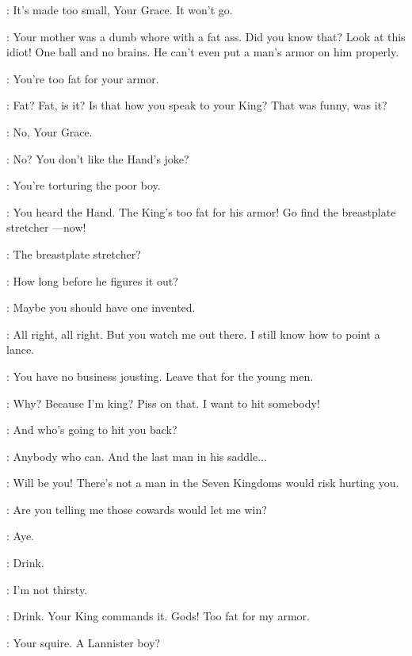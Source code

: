 
\LANCEL: It's made too small, Your Grace. It won't go. 

\ROBERT: Your mother was a dumb whore with a fat ass. Did you know that? Look at this idiot! One ball and no brains. He can't even put a man's armor on him properly. 

\NED: You're too fat for your armor. 

\ROBERT: Fat? Fat, is it? Is that how you speak to your King?  That was funny, was it? 

\LANCEL: No, Your Grace. 

\ROBERT: No? You don't like the Hand's joke? 

\NED: You're torturing the poor boy. 

\ROBERT: You heard the Hand. The King's too fat for his armor! Go find the breastplate stretcher ---now! 


\NED: The breastplate stretcher? 

\ROBERT: How long before he figures it out? 

\NED: Maybe you should have one invented. 

\ROBERT: All right, all right. But you watch me out there. I still know how to point a lance. 

\NED: You have no business jousting. Leave that for the young men. 

\ROBERT: Why? Because I'm king? Piss on that. I want to hit somebody! 

\NED: And who's going to hit you back? 

\ROBERT: Anybody who can. And the last man in his saddle$\dots$

\NED: Will be you! There's not a man in the Seven Kingdoms would risk hurting you. 

\ROBERT: Are you telling me those cowards would let me win? 

\NED: Aye. 


\ROBERT:  Drink. 

\NED: I'm not thirsty. 

\ROBERT: Drink. Your King commands it. Gods! Too fat for my armor. 

\NED: Your squire. A Lannister boy? 

